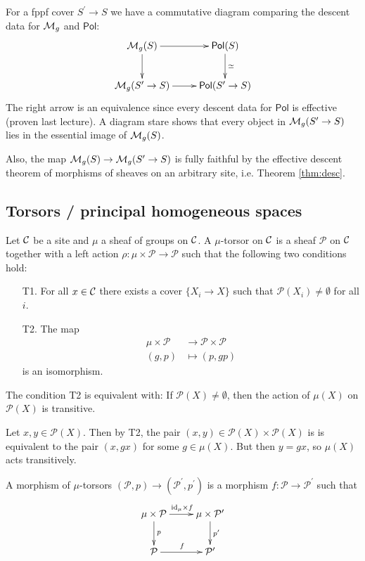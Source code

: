 \documentclass[11pt, english]{article}
\begin{document}
For a fppf cover $S^\prime \to S$ we have a commutative diagram comparing the descent data for $\mathcal{M}_g$ and $\mathsf{Pol}$:
\[
\xymatrix{
\MM_g(S) \ar[r] \ar[d] & \mathsf{Pol}(S) \ar[d]^{\simeq} \\
\MM_g(S^\prime \to S) \ar[r] & \mathsf{Pol}(S^\prime \to S)
}
\]
The right arrow is an equivalence since every descent data for $\mathsf{Pol}$ is effective (proven last lecture). A diagram stare shows that every object in $\mathcal{M}_g(S^\prime \to S)$ lies in the essential image of $\mathcal{M}_g(S)$. 

Also, the map $\mathcal{M}_g(S) \to \mathcal{M}_g(S^\prime \to S)$ is fully faithful by the effective descent theorem of morphisms of sheaves on an arbitrary site, i.e. Theorem \ref{thm:desc}.  

\subsection{Torsors / principal homogeneous spaces}

Let $\mathcal{C}$ be a site and $\mu$ a sheaf of groups on $\mathcal{C}$. A $\mu$-torsor on $\mathcal{C}$ is a sheaf $\mathcal P$ on $\mathcal{C}$ together with a left action $\rho: \mu \times \mathcal P \to \mathcal P$ such that the following two conditions hold:
\begin{enumerate}
\item [T1.] For all $x \in \mathcal{C}$ there exists a cover $\{ X_i \to X\}$ such that $\mathcal P(X_i) \neq \emptyset$ for all $i$.
\item [T2.] The map 
\begin{align*}
\mu \times \mathcal P &\to \mathcal P \times \mathcal P \\
(g,p) &\mapsto (p,gp)
\end{align*}
is an isomorphism.
\end{enumerate}

\begin{exc}
The condition T2 is equivalent with: If $\mathcal P(X) \neq \emptyset$, then the action of $\mu(X)$ on $\mathcal P(X)$ is transitive. 
\end{exc}
\begin{sol}
Let $x,y \in \mathcal P(X)$. Then by T2, the pair $(x,y) \in \mathcal P(X) \times \mathcal P(X)$ is is equivalent to the pair $(x,gx)$ for some $g \in \mu(X)$. But then $y=gx$, so $\mu(X)$ acts transitively.
\end{sol}

A morphism of $\mu$-torsors $(\mathcal P,p) \to (\mathcal P^\prime, p^\prime)$ is a morphism $f:\mathcal P \to \mathcal P^\prime$ such that 
\[
\xymatrix{
\mu \times \mathcal P \ar[r]^{\id_\mu \times f} \ar[d]^p & \mu \times \mathcal P^\prime \ar[d]^{p^\prime} \\
\mathcal P \ar[r]^f & \mathcal P^\prime
} 
\]
\end{document}

